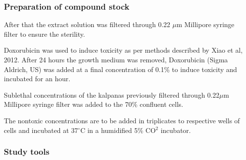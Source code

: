 \documentclass[11pt]{report} %
\begin{document}
\subsubsection{ Preparation of compound stock}
\label{subsubsec: Preparation of compound stock}

After that the extract solution was filtered through 0.22 $\mu$m Millipore syringe filter to
ensure the sterility.

Doxorubicin was used to induce toxicity as per methods described by Xiao et al, 2012. After 24
hours the growth medium was removed, Doxorubicin (Sigma Aldrich, US) was added at a final
concentration of 0.1\% to induce toxicity and incubated for an hour.

Sublethal concentrations of the kalpanas previously filtered through 0.22$\mu$m Millipore syringe filter was added to the 70\% confluent cells.

The nontoxic concentrations are to be added in triplicates to respective wells of cells and
incubated at 37$^{\circ}$C in a humidified 5\% CO$ ^{2} $ incubator.

\subsubsection{Study tools}
\label{subsubsec:Study tools}
\end{document}
